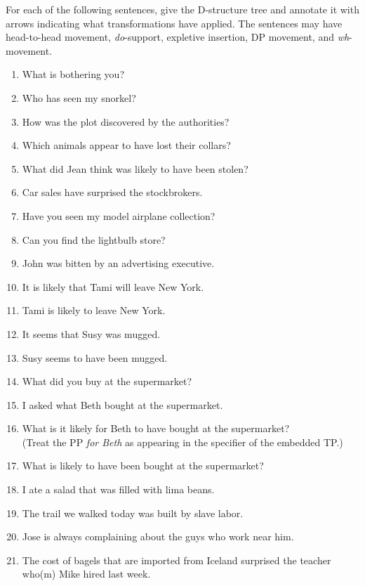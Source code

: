 ﻿\documentclass[11pt]{article}
\begin{document}
For each of the following sentences, give the D-structure tree and annotate it with arrows indicating what transformations have applied. The sentences may have head-to-head movement, \textit{do}-support, expletive insertion, DP movement, and \textit{wh}-movement.

\begin{enumerate}
  \item[a)] What is bothering you?
  \item[b)] Who has seen my snorkel?
  \item[c)] How was the plot discovered by the authorities?
  \item[d)] Which animals appear to have lost their collars?
  \item[e)] What did Jean think was likely to have been stolen?
  \item[f)] Car sales have surprised the stockbrokers.
  \item[g)] Have you seen my model airplane collection?
  \item[h)] Can you find the lightbulb store?
  \item[i)] John was bitten by an advertising executive.
  \item[j)] It is likely that Tami will leave New York.
  \item[k)] Tami is likely to leave New York.
  \item[l)] It seems that Susy was mugged.
  \item[m)] Susy seems to have been mugged.
  \item[n)] What did you buy at the supermarket?
  \item[o)] I asked what Beth bought at the supermarket.
  \item[p)] What is it likely for Beth to have bought at the supermarket?\\
  (Treat the PP \textit{for Beth} as appearing in the specifier of the embedded TP.)
  \item[q)] What is likely to have been bought at the supermarket?
  \item[r)] I ate a salad that was filled with lima beans.
  \item[s)] The trail we walked today was built by slave labor.
  \item[t)] Jose is always complaining about the guys who work near him.
  \item[u)] The cost of bagels that are imported from Iceland surprised the teacher who(m) Mike hired last week.
\end{enumerate}
\end{document}
